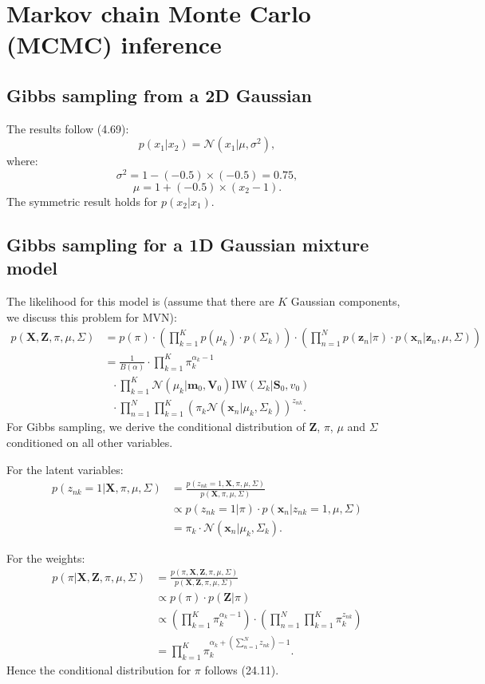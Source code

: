 \documentclass[UTF8]{ctexart}
\begin{document}
\newpage
\section{Markov chain Monte Carlo (MCMC) inference}
\subsection{Gibbs sampling from a 2D Gaussian}
The results follow (4.69):
$$p(x_{1}|x_{2})=\mathcal{N}(x_{1}|\mu,\sigma^{2}),$$
where:
$$\sigma^{2}=1-(-0.5)\times(-0.5)=0.75,$$
$$\mu=1+(-0.5)\times (x_{2}-1).$$
The symmetric result holds for $p(x_{2}|x_{1})$.

\subsection{Gibbs sampling for a 1D Gaussian mixture model}
The likelihood for this model is (assume that there are $K$ Gaussian components, we discuss this problem for MVN):
$$
\begin{aligned}
p(\textbf{X},\textbf{Z},\pi,\mu,\Sigma)&=p(\pi)\cdot \left(\prod_{k=1}^{K}p(\mu_{k})\cdot p(\Sigma_{k}) \right)\cdot \left(\prod_{n=1}^{N}p(\textbf{z}_{n}|\pi)\cdot p(\textbf{x}_{n}|\textbf{z}_{n},\mu,\Sigma)\right)\\
&=\frac{1}{B(\alpha)}\cdot\prod_{k=1}^{K}\pi_{k}^{\alpha_{k}-1}\\
&\ \ \ \cdot\prod_{k=1}^{K}\mathcal{N}(\mu_{k}|\textbf{m}_{0},\textbf{V}_{0})\text{IW}(\Sigma_{k}|\textbf{S}_{0},v_{0})\\
&\ \ \ \cdot \prod_{n=1}^{N}\prod_{k=1}^{K}\left(\pi_{k}\mathcal{N}(\textbf{x}_{n}|\mu_{k},\Sigma_{k})\right)^{z_{nk}}.
\end{aligned}
$$
For Gibbs sampling, we derive the conditional distribution of $\textbf{Z}$, $\pi$, $\mu$ and $\Sigma$ conditioned on all other variables.

For the latent variables:
$$
\begin{aligned}
p(z_{nk}=1|\textbf{X},\pi,\mu,\Sigma)&=\frac{p(z_{nk}=1,\textbf{X},\pi,\mu,\Sigma)}{p(\textbf{X},\pi,\mu,\Sigma)}\\
&\propto p(z_{nk}=1|\pi)\cdot p(\textbf{x}_{n}|z_{nk}=1,\mu,\Sigma)\\
&=\pi_{k}\cdot \mathcal{N}(\textbf{x}_{n}|\mu_{k},\Sigma_{k}).
\end{aligned}
$$

For the weights:
$$
\begin{aligned}
p(\pi|\textbf{X},\textbf{Z},\pi,\mu,\Sigma)&=\frac{p(\pi,\textbf{X},\textbf{Z},\pi,\mu,\Sigma)}{p(\textbf{X},\textbf{Z},\pi,\mu,\Sigma)}\\
&\propto p(\pi)\cdot p(\textbf{Z}|\pi) \\
&\propto \left(\prod_{k=1}^{K}\pi_{k}^{\alpha_{k}-1}\right)\cdot\left(\prod_{n=1}^{N}\prod_{k=1}^{K}\pi_{k}^{z_{nk}}\right)\\
&=\prod_{k=1}^{K}\pi_{k}^{\alpha_{k}+\left(\sum_{n=1}^{N}z_{nk}\right)-1}.
\end{aligned}
$$
Hence the conditional distribution for $\pi$ follows (24.11).
\end{document}
